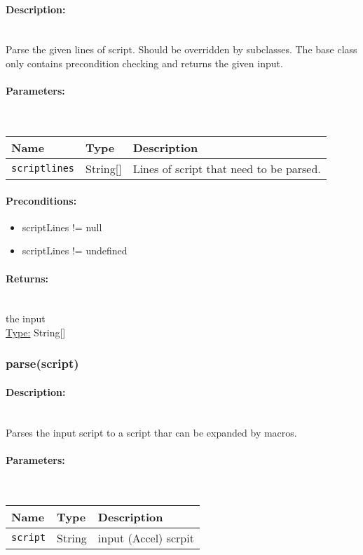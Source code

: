 \paragraph{Description:} \hfill \\ 
Parse the given lines of script.
Should be overridden by subclasses.
The base class only contains precondition checking and returns the given input.
\paragraph{Parameters:} \hfill \\ 
\begin{tabular}{|l|l|l|}
\hline
\textbf{Name} & \textbf{Type} & \textbf{Description} \\ 
\hline
\texttt{scriptlines} & String[] & Lines of script that need to be parsed.\\ 
\hline
\end{tabular}
\paragraph{Preconditions:} 
\begin{itemize}  
\item  scriptLines != null
\item  scriptLines != undefined
\end{itemize}  
\paragraph{Returns:} \hfill \\ 
the input\\ 
\underline{Type:} String[]
\subsubsection{parse(script)} 
\paragraph{Description:} \hfill \\ 
Parses the input script to a script thar can be expanded by macros.
\paragraph{Parameters:} \hfill \\ 
\begin{tabular}{|l|l|l|}
\hline
\textbf{Name} & \textbf{Type} & \textbf{Description} \\ 
\hline
\texttt{script} & String & input (Accel) scrpit\\ 
\hline
\end{tabular}
